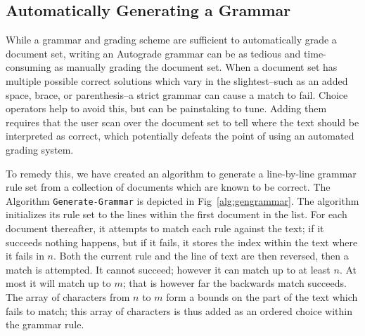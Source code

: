 \subsection{Automatically Generating a Grammar}

While a grammar and grading scheme are sufficient to automatically grade a
document set, writing an Autograde grammar can be as tedious and time-consuming
as manually grading the document set.  When a document set has multiple
possible correct solutions which vary in the slightest--such as an added space,
brace, or parenthesis--a strict grammar can cause a match to fail.  Choice
operators help to avoid this, but can be painstaking to tune.  Adding them
requires that the user scan over the document set to tell where the text should
be interpreted as correct, which potentially defeats the point of using an
automated grading system.

To remedy this, we have created an algorithm to generate a line-by-line grammar
rule set from a collection of documents which are known to be correct.  The
Algorithm \texttt{Generate-Grammar} is depicted in Fig~\ref{alg:gengrammar}.
The algorithm initializes its rule set to the lines within the first document
in the list.  For each document thereafter, it attempts to match each rule
against the text; if it succeeds nothing happens, but if it fails, it stores
the index within the text where it fails in $n$.  Both the current rule and the
line of text are then reversed, then a match is attempted.  It cannot succeed;
however it can match up to at least $n$.  At most it will match up to $m$; that
is however far the backwards match succeeds. The array of characters from $n$
to $m$ form a bounds on the part of the text which fails to match; this array
of characters is thus added as an ordered choice within the grammar rule.

